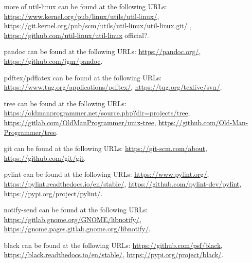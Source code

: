 \documentclass{article}
\begin{document}
more of util-linux can be found at the following URLs:\newline
\url{https://www.kernel.org/pub/linux/utils/util-linux/},\newline
{\small
  \url{https://git.kernel.org/pub/scm/utils/util-linux/util-linux.git/}
},\newline
\url{https://github.com/util-linux/util-linux} official?.

pandoc can be found at the following URLs:\newline
\url{https://pandoc.org/},\newline
\url{https://github.com/jgm/pandoc}.

pdftex/pdflatex can be found at the following URLs:\newline
\url{https://www.tug.org/applications/pdftex/},\newline
\url{https://tug.org/texlive/svn/}.

tree can be found at the following URLs:\newline
\url{https://oldmanprogrammer.net/source.php?dir=projects/tree},\newline
\url{https://gitlab.com/OldManProgrammer/unix-tree},\newline
\url{https://github.com/Old-Man-Programmer/tree}.

git can be found at the following URLs:\newline
\url{https://git-scm.com/about},\newline
\url{https://github.com/git/git}.

pylint can be found at the following URLs:\newline
\url{https://www.pylint.org/},\newline
\url{https://pylint.readthedocs.io/en/stable/},\newline
\url{https://github.com/pylint-dev/pylint},\newline
\url{https://pypi.org/project/pylint/}.

notify-send can be found at the following URLs:\newline
\url{https://gitlab.gnome.org/GNOME/libnotify/},\newline
\url{https://gnome.pages.gitlab.gnome.org/libnotify/}.

black can be found at the following URLs:\newline
\url{https://github.com/psf/black},\newline
\url{https://black.readthedocs.io/en/stable/},\newline
\url{https://pypi.org/project/black/}.
\end{document}
